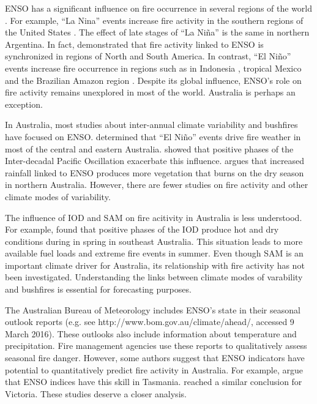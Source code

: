 ENSO has a significant influence on fire occurrence in several regions
of the world \citep{Carmona-Moreno2005}. For example, \textquotedblleft La
Nina\textquotedblright{} events increase fire activity in the southern
regions of the United States \citep{Swetnam1990,Beckage2003}. The
effect of late stages of ``La Ni\~na'' is the same in northern Argentina.
In fact, \citet{Kitzberger2001} demonstrated that fire activity linked
to ENSO is synchronized in regions of North and South America. In
contrast, \textquotedblleft El Ni\~no\textquotedblright{} events increase
fire occurrence in regions such as in Indonesia \citep{Wooster2012},
tropical Mexico \citep{Roman-Cuesta2003} and the Brazilian Amazon
region \citep{Barlow2004}. Despite its global influence, ENSO's role
on fire activity remains unexplored in most of the world. Australia
is perhaps an exception. 

In Australia, most studies about inter-annual climate variability
and bushfires have focused on ENSO. \citet{Williams1999} determined
that \textquotedblleft El Ni\~no\textquotedblright{} events drive fire
weather in most of the central and eastern Australia. \citet{Verdon2004}
showed that positive phases of the Inter-decadal Pacific Oscillation
exacerbate this influence. \citet{Harris2008} argues that increased
rainfall linked to ENSO produces more vegetation that burns on the
dry season in northern Australia. However, there are fewer studies
on fire activity and other climate modes of variability. 

The influence of IOD and SAM on fire acitivity in Australia is less
understood. For example, \citet{Cai2009} found that positive phases
of the IOD produce hot and dry conditions during in spring in southeast
Australia. This situation leads to more available fuel loads and extreme
fire events in summer. Even though SAM is an important climate driver
for Australia, its relationship with fire activity has not been investigated.
Understanding the links between climate modes of varability and bushfires
is essential for forecasting purposes. 

The Australian Bureau of Meteorology includes ENSO's state in their
seasonal outlook reports (e.g. see http://www.bom.gov.au/climate/ahead/,
accessed 9 March 2016). These outlooks also include information about
temperature and precipitation. Fire management agencies use these
reports to qualitatively assess seasonal fire danger. However, some
authors suggest that ENSO indicators have potential to quantitatively
predict fire activity in Australia. For example, \citet{Nicholls2007}
argue that ENSO indices have this skill in Tasmania. \citet{Harris2013}
reached a similar conclusion for Victoria. These studies deserve a
closer analysis.

